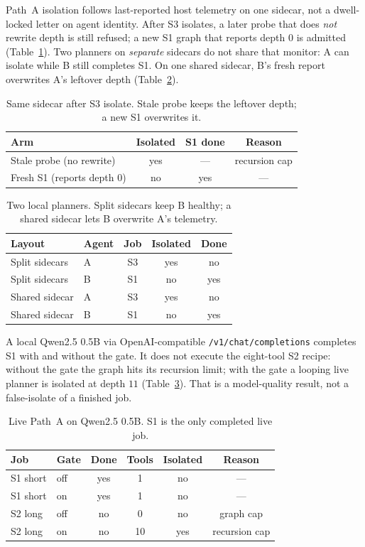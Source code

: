 \documentclass{article}
\begin{document}
Path~A isolation follows last-reported host telemetry on one sidecar, not a dwell-locked letter on agent identity.
After S3 isolates, a later probe that does \emph{not} rewrite depth is still refused; a new S1 graph that reports depth $0$ is admitted (Table~\ref{tab:persist}).
Two planners on \emph{separate} sidecars do not share that monitor: A can isolate while B still completes S1.
On one shared sidecar, B's fresh report overwrites A's leftover depth (Table~\ref{tab:two}).

\begin{table}[h]
\centering
\caption{Same sidecar after S3 isolate. Stale probe keeps the leftover depth; a new S1 overwrites it.}
\label{tab:persist}
{\scriptsize
\begin{tabular}{lccc}
\toprule
Arm & Isolated & S1 done & Reason \\
\midrule
Stale probe (no rewrite) & yes & --- & recursion cap \\
Fresh S1 (reports depth $0$) & no & yes & --- \\
\bottomrule
\end{tabular}
}
\end{table}

\begin{table}[h]
\centering
\caption{Two local planners. Split sidecars keep B healthy; a shared sidecar lets B overwrite A's telemetry.}
\label{tab:two}
{\scriptsize
\begin{tabular}{llccc}
\toprule
Layout & Agent & Job & Isolated & Done \\
\midrule
Split sidecars & A & S3 & yes & no \\
Split sidecars & B & S1 & no & yes \\
Shared sidecar & A & S3 & yes & no \\
Shared sidecar & B & S1 & no & yes \\
\bottomrule
\end{tabular}
}
\end{table}

A local Qwen2.5 0.5B via OpenAI-compatible \texttt{/v1/chat/completions} completes S1 with and without the gate.
It does not execute the eight-tool S2 recipe: without the gate the graph hits its recursion limit; with the gate a looping live planner is isolated at depth $11$ (Table~\ref{tab:live}).
That is a model-quality result, not a false-isolate of a finished job.

\begin{table}[h]
\centering
\caption{Live Path~A on Qwen2.5 0.5B. S1 is the only completed live job.}
\label{tab:live}
{\scriptsize
\begin{tabular}{llcccc}
\toprule
Job & Gate & Done & Tools & Isolated & Reason \\
\midrule
S1 short & off & yes & 1 & no & --- \\
S1 short & on & yes & 1 & no & --- \\
S2 long & off & no & 0 & no & graph cap \\
S2 long & on & no & 10 & yes & recursion cap \\
\bottomrule
\end{tabular}
}
\end{table}
\end{document}
